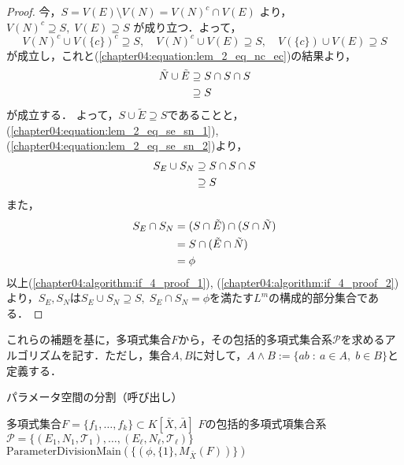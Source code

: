 \begin{proof}
	今，$S = V(E) \setminus V(N) = V(N)^c \cap V(E)$
	より，
	$V(N)^c \supseteq S, \; V(E) \supseteq S$
	が成り立つ．よって，
	$$V(N)^c \cup V(\{c\})^c \supseteq S, \quad V(N)^c \cup V(E) \supseteq S, \quad V(\{c\}) \cup V(E) \supseteq S$$
	が成立し，これと(\ref{chapter04:equation:lem_2_eq_nc_ec})の結果より，
	\begin{align}
		\tilde{N} \cup \tilde{E} &\supseteq S \cap S \cap S \notag\\
		&\supseteq S \label{chapter04:equation:lem_2_eq_se_sn_2}
	\end{align}
	が成立する．
	よって，$S \cup \tilde{E} \supseteq S$であることと，(\ref{chapter04:equation:lem_2_eq_se_sn_1}), (\ref{chapter04:equation:lem_2_eq_se_sn_2})より，
	\begin{align}
		S_E \cup S_N &\supseteq S \cap S \cap S \notag\\
		&\supseteq S \label{chapter04:algorithm:if_4_proof_1}
	\end{align}
	また，
	\begin{align}
		S_E \cap S_N &= (S \cap \tilde{E}) \cap (S \cap \tilde{N}) \notag \\
		&= S \cap (\tilde{E} \cap \tilde{N}) \notag \\
		&= \phi \label{chapter04:algorithm:if_4_proof_2}
	\end{align}
	以上(\ref{chapter04:algorithm:if_4_proof_1}), (\ref{chapter04:algorithm:if_4_proof_2})より，$S_E, S_N$は$S_E \cup S_N \supseteq S,\; S_E \cap S_N = \phi$を満たす$L^m$の構成的部分集合である．
\end{proof}

これらの補題を基に，多項式集合$F$から，その包括的多項式集合系$\mathcal{P}$を求めるアルゴリズムを記す．ただし，集合$A, B$に対して，$A \land B := \{ ab \; : \: a \in A, \; b \in B \}$と定義する．

\begin{algorithm}[htbp]
\caption{パラメータ空間の分割（呼び出し）}
\label{chapter04:algorithm:PD_alg_num}
\begin{algorithmic}[1]
\Require 多項式集合$F=\{ f_1, \dots, f_k \} \subset K[\bar{X}, \bar{A}]$
\Ensure $F$の包括的多項式項集合系$\mathcal{P}=\{ (E_1, N_1, \mathscr{T}_1), \dots, (E_\ell, N_\ell, \mathscr{T}_\ell) \}$
	\State \Return $ \mathrm{ParameterDivisionMain}(\{(\phi, \{ 1 \}, M_{\bar{X}}(F))\})$
\EndFunction
\end{algorithmic}
\end{algorithm}

